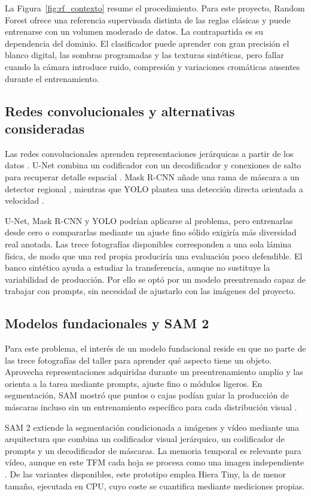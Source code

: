 La Figura~\ref{fig:rf_contexto} resume el procedimiento. Para este proyecto, Random Forest ofrece una referencia supervisada distinta de las reglas clásicas y puede entrenarse con un volumen moderado de datos. La contrapartida es su dependencia del dominio. El clasificador puede aprender con gran precisión el blanco digital, las sombras programadas y las texturas sintéticas, pero fallar cuando la cámara introduce ruido, compresión y variaciones cromáticas ausentes durante el entrenamiento.

\subsection{Redes convolucionales y alternativas consideradas}

Las redes convolucionales aprenden representaciones jerárquicas a partir de los datos \cite{LeCun1998}. U-Net combina un codificador con un decodificador y conexiones de salto para recuperar detalle espacial \cite{Ronneberger2015}. Mask R-CNN añade una rama de máscara a un detector regional \cite{He2017}, mientras que YOLO plantea una detección directa orientada a velocidad \cite{Redmon2016}.

U-Net, Mask R-CNN y YOLO podrían aplicarse al problema, pero entrenarlas desde cero o compararlas mediante un ajuste fino sólido exigiría más diversidad real anotada. Las trece fotografías disponibles corresponden a una sola lámina física, de modo que una red propia produciría una evaluación poco defendible. El banco sintético ayuda a estudiar la transferencia, aunque no sustituye la variabilidad de producción. Por ello se optó por un modelo preentrenado capaz de trabajar con prompts, sin necesidad de ajustarlo con las imágenes del proyecto.

\subsection{Modelos fundacionales y SAM 2}

Para este problema, el interés de un modelo fundacional reside en que no parte de las trece fotografías del taller para aprender qué aspecto tiene un objeto. Aprovecha representaciones adquiridas durante un preentrenamiento amplio y las orienta a la tarea mediante prompts, ajuste fino o módulos ligeros. En segmentación, SAM mostró que puntos o cajas podían guiar la producción de máscaras incluso sin un entrenamiento específico para cada distribución visual \cite{Kirillov2023}.

SAM 2 extiende la segmentación condicionada a imágenes y vídeo mediante una arquitectura que combina un codificador visual jerárquico, un codificador de prompts y un decodificador de máscaras. La memoria temporal es relevante para vídeo, aunque en este TFM cada hoja se procesa como una imagen independiente \cite{Ravi2025}. De las variantes disponibles, este prototipo emplea Hiera Tiny, la de menor tamaño, ejecutada en CPU, cuyo coste se cuantifica mediante mediciones propias.

